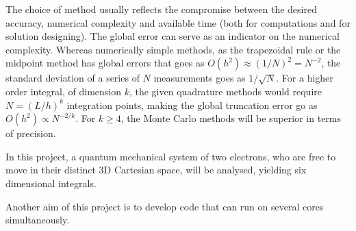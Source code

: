 \documentclass[a4paper,11pt]{article}
\begin{document}
The choice of method usually reflects the compromise between the desired accuracy, numerical complexity and available time (both for computations and for solution designing). The global error can serve as an indicator on the numerical complexity. Whereas numerically simple methods, as the trapezoidal rule or the midpoint method has global errors that goes as $O(h^2) \approx \left( 1/N \right)^2 = N^{-2}$, the standard deviation of a series of $N$ measurements goes as $1/\sqrt{N}$. For a higher order integral, of dimension $k$, the given quadrature methods would require $N = (L/h)^k$ integration points, making the global truncation error go as $O(h^2) \propto N^{-2/k}$. For $k \geq 4$, the Monte Carlo methods will be superior in terms of precision. 

In this project, a quantum mechanical system of two electrons, who are free to move in their distinct 3D Cartesian space, will be analysed, yielding six dimensional integrals.

Another aim of this project is to develop code that can run on several cores simultaneously.
\end{document}
